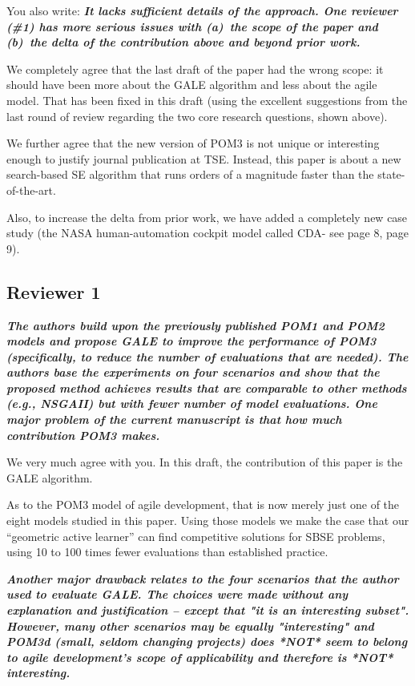 \documentclass[10pt,journal,compsoc]{IEEEtran}
\begin{document}
You also write: {\bf {\em It lacks sufficient details of the
    approach.  One reviewer (\#1) has more serious
    issues with (a)~the scope of the paper and
    (b)~the delta of the contribution above and
    beyond prior work.}}


We completely agree that the last draft of the paper had the
wrong scope: it should have been more about the GALE
algorithm and less about the agile model.  That has been fixed in this draft (using the excellent 
suggestions from the last round of review regarding the two core research questions, shown above).

We further agree that  the new version of POM3 is not unique or interesting
enough  to justify journal publication at TSE.  Instead, this paper is about
 a new search-based SE algorithm
that runs orders of a magnitude faster than the
state-of-the-art.

Also, to increase the delta from prior work, we have 
added a completely new case study (the NASA human-automation cockpit model called CDA- see page 8, page 9).



\subsection*{Reviewer 1}


{\bf {\em The authors build upon the previously published
  POM1 and POM2 models and propose GALE to improve
  the performance of POM3 (specifically, to reduce
  the number of evaluations that are needed). The
  authors base the experiments on four scenarios and
  show that the proposed method achieves results
  that are comparable to other methods (e.g.,
  NSGAII) but with fewer number of model
  evaluations.  One major problem of the current
  manuscript is that how much contribution POM3
  makes.}}

We very much agree with you.  In this draft, the contribution of this paper is the GALE algorithm.

As to the POM3 model of agile development, that is now merely just one of the eight models studied in this paper.
Using those models we make the case that our ``geometric active learner'' can find competitive solutions for SBSE problems,
using 10 to 100 times fewer evaluations than established practice.


{\bf {\em Another major drawback relates to the four
  scenarios that the author used to evaluate
  GALE. The choices were made without any
  explanation and justification -- except that "it
  is an interesting subset". However, many other
  scenarios may be equally "interesting" and POM3d
  (small, seldom changing projects) does *NOT* seem
  to belong to agile development's scope of
  applicability and therefore is *NOT*
  interesting. }}
\end{document}
